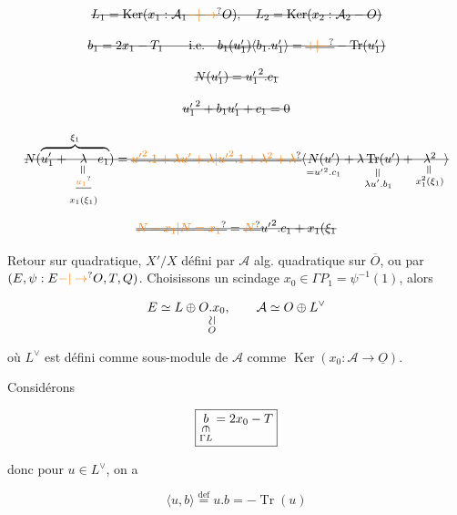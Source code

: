 \[ \deleted{L_1=\operatorname{Ker}(x_1:\mathcal{A}_1\unsure{-|\to}O),\quad L_2=\operatorname{Ker}(x_2:\mathcal{A}_2-O)} \]


\[ \deleted{b_1=2x_1-T_1\qquad\text{i.e.}\quad \deleted{b_1(u'_1)}\inserted{b_1.u'_1}=\deleted{\unsure{+|-}}-\operatorname{Tr}(u'_1)} \]


\[ \deleted{N(u'_1)={u'_1}^2.c_1} \]


\[ \deleted{{u'_1}^2+b_1 u'_1+c_1=0} \]


\[ \deleted{N(\overbrace{u'_1+\underset{\substack{\rotatebox{90}{$=$}\\\deleted{\unsure{u_1}}\\x_1(\xi_1)}}{\lambda}e_1}^{\xi_1})=\deleted{\unsure{{u'}^2.1+\lambda u'+\lambda|{u'}^2.1+\lambda^2+\lambda}}\inserted{\underset{={u'}^2.c_1}{N(u')}+\underset{\substack{\rotatebox{90}{$=$}\\\lambda u'.b_1}}{\lambda\operatorname{Tr}(u')}+\underset{\substack{\rotatebox{90}{$=$}\\x_1^2(\xi_1)}}{\lambda^2}}} \]


\[ \deleted{\deleted{\unsure{N-x_1|N=x_1}}=\deleted{\unsure{N}}{u'}^2.c_1+x_1(\xi_1} \]


Retour sur   quadratique, $X'/X$ défini par $\mathcal{A}$ alg. quadratique sur $\overline O$, ou par $(E,\psi:E\unsure{-|\to}O,T,Q)$. Choisissons un scindage $x_0\in\Gamma P_{1}=\psi^{-1}(1)$, alors

\[ E\simeq L\oplus\underset{\substack{\rotatebox{90}{$\simeq$}\\O}}{O.x_0},\qquad \mathcal{A}\simeq O\oplus L^\vee \]

où $L^\vee$ est défini comme sous-module de $\mathcal A$  comme $\operatorname{Ker}(x_0:\mathcal{A}\to\underline O)$.

Considérons

\[ \boxed{\underset{\substack{\rotatebox{-90}{$\in$}\\\Gamma L}}{b}=2x_0-T} \]

donc pour $u\in L^\vee$, on a

\[ \langle u,b\rangle\overset{\mathrm{def}}{=}\boxed{u.b=-\operatorname{Tr}(u)} \]

